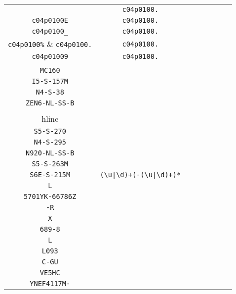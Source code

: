 \begin{longtable}{cccccccc}
\begin{tabular}{ll}
    \verb|c04p0100J| & \verb|c04p0100.|\\
\verb|c04p0100E| & \verb|c04p0100.|\\
\verb|c04p0100_| & \verb|c04p0100.|\\
\verb|c04p0100%| & \verb|c04p0100.|\\
\verb|c04p01009| & \verb|c04p0100.|
\end{tabular}
\\\midrule 
\begin{tabular}{l}
    \verb|S6E-S-216M|\\
\verb|MC160|\\
\verb|I5-S-157M|\\
\verb|N4-S-38|\\
\verb|ZEN6-NL-SS-B|\\
\\hline\\
\verb|S5-S-270|\\
\verb|N4-S-295|\\
\verb|N920-NL-SS-B|\\
\verb|S5-S-263M|\\
\verb|S6E-S-215M|
\end{tabular}

&
\verb.(\u|\d)+(-(\u|\d)+)*.
&

\begin{tabular}{l}
    \verb|(\u)*(\d)*((\u)*-(\d)*)*(\u)*|\\
\verb|L|\\
\verb|5701YK-66786Z|\\
\verb|-R|\\
\verb|X|\\
\verb|689-8|
\end{tabular}

&

\begin{tabular}{l}
    \verb|\u(\u)*(\d)*((\u)*-(\d)*)*(\u)*|\\
\verb|L|\\
\verb|L093|\\
\verb|C-GU|\\
\verb|VE5HC|\\
\verb|YNEF4117M-|
\end{tabular}

&


\end{longtable}
